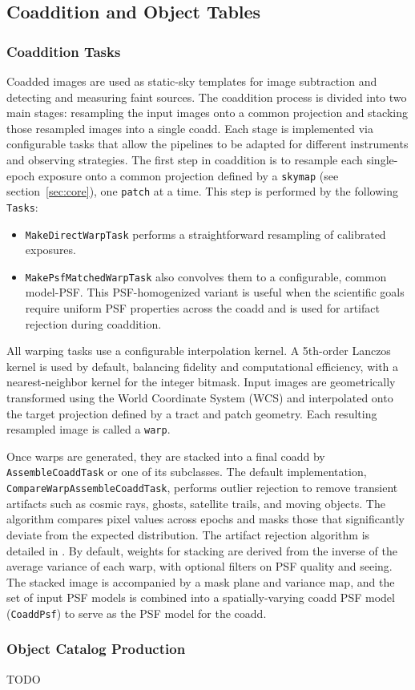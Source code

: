 \subsection{Coaddition and Object Tables}

\subsubsection{Coaddition Tasks}
\label{sec:coaddition}

Coadded images are used as static-sky templates for image subtraction and detecting and measuring faint sources.
The coaddition process is divided into two main stages: resampling the input images onto a common projection and stacking those resampled images into a single coadd.
Each stage is implemented via configurable tasks that allow the pipelines to be adapted for different instruments and observing strategies.
The first step in coaddition is to resample each single-epoch exposure onto a common projection defined by a \texttt{skymap} (see section~\ref{sec:core}), one \texttt{patch} at a time.
This step is performed by the following \texttt{Tasks}:
\begin{itemize}
\item \texttt{MakeDirectWarpTask} performs a straightforward resampling of calibrated exposures.
 \item \texttt{MakePsfMatchedWarpTask} also convolves them to a configurable, common model-PSF.
 This PSF-homogenized variant is useful when the scientific goals require uniform PSF properties across the coadd and is used for artifact rejection during coaddition.
 \end{itemize}

All warping tasks use a configurable interpolation kernel. A 5th-order Lanczos kernel is used by default, balancing fidelity and computational efficiency, with a nearest-neighbor kernel for the integer bitmask.
Input images are geometrically transformed using the World Coordinate System (WCS) and interpolated onto the target projection defined by a tract and patch geometry.
Each resulting resampled image is called a \texttt{warp}.

Once warps are generated, they are stacked into a final coadd by \texttt{AssembleCoaddTask} or one of its subclasses.
The default implementation, \texttt{CompareWarpAssembleCoaddTask}, performs outlier rejection to remove transient artifacts such as cosmic rays, ghosts, satellite trails, and moving objects.
The algorithm compares pixel values across epochs and masks those that significantly deviate from the expected distribution.
The artifact rejection algorithm is detailed in \citet{DMTN-080}.
By default, weights for stacking are derived from the inverse of the average variance of each warp, with optional filters on PSF quality and seeing.
The stacked image is accompanied by a mask plane and variance map, and the set of input PSF models is combined into a spatially-varying coadd PSF model (\texttt{CoaddPsf}) to serve as the PSF model for the coadd.

\subsubsection{Object Catalog Production}

TODO
